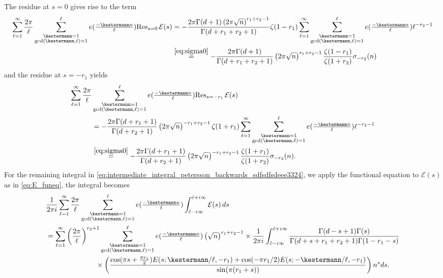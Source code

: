 \documentclass[]{article}
\newcommand{\sumk}{\sum_{\substack{\kestermann = 1 \\ \gcd(\kestermann,\ell) = 1}}^\ell}
\begin{document}
The residue at $s=0$ gives rise to the term
\begin{equation}
\begin{split}
\sum_{\ell=1}^\infty \frac{2 \pi }{\ell}   \sumk e(\tfrac{-\kestermann n}{\ell}) \text{Res}_{s=0}\,\mathcal{E}(s)  
&=-\frac{ 2 \pi   \Gamma(d+1)  \left(2 \pi \sqrt{n} \right)^{r_1+r_2-1} }{\Gamma (d+r_1+r_2+1)  } \zeta(1-r_1) \sum_{\ell=1}^\infty     \sumk e(\tfrac{-\kestermann n}{\ell})    \ell^{-r_2-1}\\
& \stackrel{\eqref{eq:sigma0}}{=} -\frac{ 2 \pi   \Gamma(d+1)  }{\Gamma (d+r_1+r_2+1)  }  \left(2 \pi \sqrt{n} \right)^{r_1+r_2-1} \frac{\zeta(1-r_1)}{\zeta(1+r_2)}\sigma_{-r_2}(n)
\end{split}    
\end{equation}
and the residue at $s=-r_1$ yields
\begin{equation}
\begin{split}
\sum_{\ell=1}^\infty \frac{2 \pi }{\ell}  & \sumk e(\tfrac{-\kestermann n}{\ell})  \text{Res}_{s=-r_1}\,\mathcal{E}(s) \\
& = -\frac{ 2 \pi  \Gamma(d+r_1+1)  }{\Gamma (d+r_2+1)  }      \left( 2 \pi \sqrt{n}\right)^{-r_1+r_2-1}\zeta(1+r_1)\sum_{\ell=1}^\infty   \sumk e(\tfrac{-\kestermann n}{\ell})     \ell^{-r_2-1}\\ 
& \stackrel{\eqref{eq:sigma0}}{=} - \frac{ 2 \pi  \Gamma(d+r_1+1)  }{\Gamma (d+r_2+1)  }      \left( 2 \pi \sqrt{n}\right)^{-r_1+r_2-1}\frac{\zeta(1+r_1)}{\zeta(1+r_2)}\sigma_{-r_2}(n).    
\end{split}    
\end{equation}
For the remaining integral in \eqref{eq:intermediate_integral_petersson_backwards_sdfsdfsdeee3324}, we apply the functional equation to $\mathcal{E}(s)$ as in \eqref{eq:E_funeq}, the integral becomes 
\begin{equation}\label{eq:t1t2}
	\begin{split}
&\frac{1}{2 \pi i}   \sum_{\ell=1}^\infty \frac{2 \pi }{\ell}   \sumk e(\tfrac{-\kestermann n}{\ell}) \int_{\tilde c-i \infty}^{\tilde c+i \infty}\mathcal{E}(s)\, ds \\
          &   = 		  \sum_{\ell=1}^\infty   \left( \frac{2 \pi }{\ell} \right)^{r_2+1}   \sumk e(\tfrac{-\kestermann n}{\ell}) \left(  \sqrt{n}  \right)^{r_1+r_2-1} \times \frac{1}{2 \pi i}  \int_{\tilde c-i \infty}^{\tilde c+i \infty} \frac{   \Gamma(d-s+1)   \Gamma(s)  }{\Gamma (d+s+r_1+r_2+1) \Gamma(1-r_1-s)  }\\
&      \ \ \ \ \ \ \ \ \  \ \ \ \ \ \  \ \ \ \ \ \  \times       \left(  \frac{\cos(\pi s + \frac{\pi r_1}{2}) E(s;\kestermann/\ell,-r_1) + \cos(- \pi r_1/2 ) E(s;-\kestermann/\ell,-r_1)  }{\sin(\pi (r_1+s))} \right) n^{s}  ds.
    \end{split}
    \end{equation}
\end{document}
